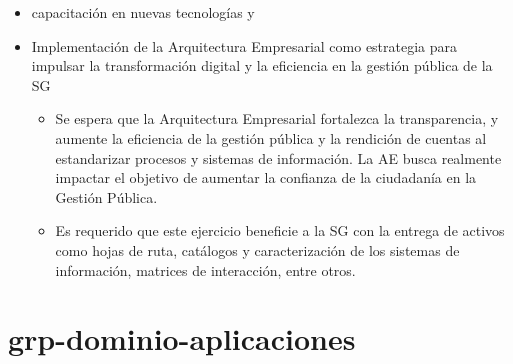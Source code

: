 \documentclass[
	a4paper, %
	12pt, %
]{include/CSSullivanBusinessReport}
\def\tightlist{}
\begin{document}
\begin{itemize}
  \begin{itemize}
  \tightlist
  \item
    Se busca la consolidación de herramientas, canales e información
    para fortalecer la oferta y celeridad de servicios y la
    participación ciudadana. Esto incluye el seguimiento a canales de
    atención virtual como SuperCADE Virtual, chat, chat-Bot y (video)
    llamadas de la línea 195.
  \item
    Se busca optimizar los procesos de recolección, análisis y
    divulgación de la información mediante la implementación de sistemas
    de información que incluyan la automatización de la recolección de
    datos y el uso de herramientas analíticas.
  \item
    Es destacado que el Distrito unifica en el portal Bogotá su oferta
    de trámites y servicios, como el realizar pagos en línea (no
    tributarios) y agendamiento de citas en la RedCADE desde casa;
    esfuerzo que debe continuar y extenderse a los más de 1.400 trámites
    y servicios. Esto representa una mejora significativa en la
    accesibilidad y eficiencia de los servicios digitales para la
    ciudadanía.
  \end{itemize}
\item
  capacitación en nuevas tecnologías y
\item
  Implementación de la Arquitectura Empresarial como estrategia para
  impulsar la transformación digital y la eficiencia en la gestión
  pública de la SG

  \begin{itemize}
  \tightlist
  \item
    Se espera que la Arquitectura Empresarial fortalezca la
    transparencia, y aumente la eficiencia de la gestión pública y la
    rendición de cuentas al estandarizar procesos y sistemas de
    información. La AE busca realmente impactar el objetivo de aumentar
    la confianza de la ciudadanía en la Gestión Pública.
  \item
    Es requerido que este ejercicio beneficie a la SG con la entrega de
    activos como hojas de ruta, catálogos y caracterización de los
    sistemas de información, matrices de interacción, entre otros.
  \end{itemize}
\end{itemize}

\newpage

\section{grp-dominio-aplicaciones}\label{sec:grp-dominio-aplicaciones}
\end{document}

